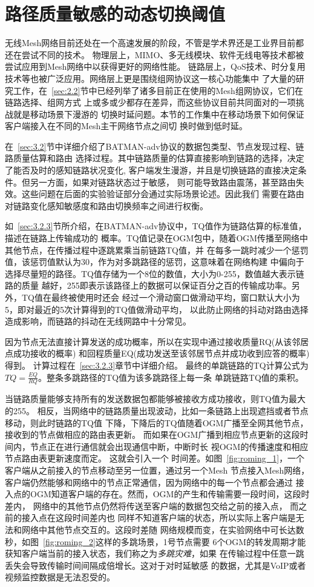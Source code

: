 \section{路径质量敏感的动态切换阈值}
\label{sec:3}
无线Mesh网络目前还处在一个高速发展的阶段，不管是学术界还是工业界目前都还在尝试不同的技术。
物理层上，MIMO、多无线模块、软件无线电等技术都被尝试应用到Mesh网络中以获得更好的网络性能。
链路层上，QoS技术、时分复用技术等也被广泛应用。网络层上更是围绕组网协议这一核心功能集中
了大量的研究工作，在~\ref{sec:2.2}节中已经列举了诸多目前正在使用的Mesh组网协议，它们在链路选择、组网方式
上或多或少都存在差异，而这些协议目前共同面对的一项挑战就是移动场景下漫游的
切换时延问题。本节的工作集中在移动场景下如何保证客户端接入在不同的Mesh主干网络节点之间切
换时做到低时延。

在~\ref{sec:3.2}节中详细介绍了BATMAN-adv协议的数据包类型、节点发现过程、链路质量估算和路由
选择过程。其中链路质量的估算直接影响到链路的选择，决定了能否及时的感知链路状况变化,
客户端发生漫游，并且是切换链路的直接决定条件。但另一方面，如果对链路状态过于敏感，
则可能导致路由震荡，甚至路由失效。这些问题在后面的实验验证部分会通过实际场景论述。因此我们
需要在路由对链路变化感知敏感度和路由切换频率之间进行权衡。

如~\ref{sec:3.2.3}节所介绍，在BATMAN-adv协议中，TQ值作为链路估算的标准值，描述在链路上传输成功的
概率。TQ值记录在OGM包中，随着OGM传播至网络中其他节点，在传播过程中逐跳累乘当前链路TQ值，并
在每多一跳时减少一个惩罚值，该惩罚值默认为30，作为对多跳路径的惩罚，这意味着在网络构建
中偏向于选择尽量短的路径。TQ值存储为一个8位的数值，大小为0-255，数值越大表示链路的质量
越好，255即表示该路径上的数据可以保证百分之百的传输成功率。另外，TQ值在最终被使用时还会
经过一个滑动窗口做滑动平均，窗口默认大小为5，即对最近的5次计算得到的TQ值做滑动平均，
以此防止网络的抖动对路由选择造成影响，而链路的抖动在无线网路中十分常见。

因为节点无法直接计算发送的成功概率，所以在实现中通过接收质量RQ(从该邻居点成功接收的概率)
和回程质量EQ(成功发送至该邻居节点并成功收到应答的概率)得到。
计算过程在~\ref{sec:3.2.3}章节中详细介绍。
最终的单跳链路的TQ计算公式为$TQ=\frac{EQ}{RQ}$。整条多跳路径的TQ值为该多跳路径上每一条
单跳链路TQ值的乘积。

当链路质量能够支持所有的发送数据包都能够被接收方成功接收，则TQ值为最大的255。
相反，当网络中的链路质量出现波动，比如一条链路上出现遮挡或者节点移动，则此时链路的TQ值
下降，下降后的TQ值随着OGM广播至全网其他节点，接收到的节点做相应的路由表更新。
而如果在OGM广播到相应节点更新的这段时间内，节点正在进行通信就会出现通信中断，中断时长
视OGM的传播速度和相应节点路由表更新速度而定。
这就会引入一个
时间差。如图~\ref{fig:roming_1}，一个客户端从之前接入的节点移动至另一位置，通过另一个Mesh
节点接入Mesh网络，客户端仍然能够和网络中的节点正常通信，因为网络中的每一个节点都会通过
接入点的OGM知道客户端的存在。然而，OGM的产生和传输需要一段时间，这段时差内，
网络中的其他节点仍然将传送至客户端的数据包交给之前的接入点，
而之前的接入点在这段时间差内也
同样不知道客户端的状态，所以实际上客户端是无法和网络中其他节点交互的。这段时差随
网络规模而变，在实验网络中可长达数秒，如图~\ref{fig:roming_2}这样的多跳场景，1号节点需要
6个OGM的转发周期才能获知客户端当前的接入状态，我们称之为\emph{多跳灾难}，如果
在传输过程中任意一跳丢失会导致传输时间间隔成倍增长。这对于对时延敏感
的数据，尤其是VoIP或者视频监控数据是无法忍受的。

